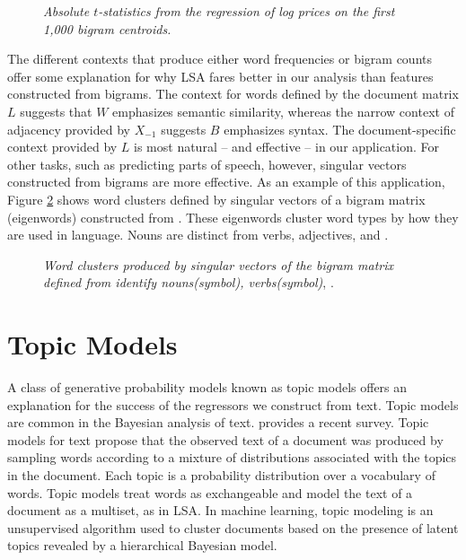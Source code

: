 \documentclass[12pt]{article}
\begin{document}
 
\begin{figure}
\caption{  \label{fig:bigramtstats}  
  {\sl Absolute $t$-statistics from the regression of log prices on the first 1,000 bigram centroids.}  }
\end{figure}


The different contexts that produce either word frequencies or bigram counts offer some explanation for why LSA fares better in our analysis than features constructed from bigrams.  The context for words defined by the document matrix $L$ suggests that $W$ emphasizes semantic similarity, whereas the narrow context of adjacency provided by $X_{-1}$ suggests $B$ emphasizes syntax.   The document-specific context provided by $L$ is most natural -- and effective -- in our application.  For other tasks, such as predicting parts of speech, however, singular vectors constructed from bigrams are more effective.  As an example of this application, Figure \ref{fig:pos} shows word clusters defined by singular vectors of a bigram matrix  (eigenwords) constructed from  .  These eigenwords cluster word types by how they are used in language.  Nouns are distinct from verbs, adjectives, and .  


\begin{figure}
\caption{  \label{fig:pos}  
  {\sl Word clusters produced by singular vectors of the bigram matrix defined from  identify nouns(symbol), verbs(symbol)}, . }
\end{figure}


\section{Topic Models}
\label{sec:topic}


A class of generative probability models known as topic models offers an explanation for the success of the regressors we construct from text.  Topic models are common in the Bayesian analysis of text. \citet{blei12} provides a recent survey.   Topic models for text propose that the observed text of a document was produced by sampling words according to a mixture of distributions associated with the topics in the document.  Each topic is a probability distribution over a vocabulary of words.  Topic models treat words as exchangeable and model the text of a document as a multiset,  as in LSA.  In machine learning, topic modeling is  an unsupervised algorithm used to cluster documents based on the presence of latent topics revealed by a hierarchical Bayesian model. 
\end{document}
